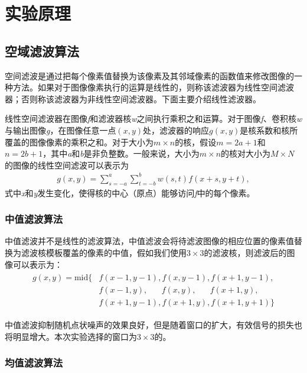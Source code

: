 \documentclass{hitreport}
\begin{document}
\section{实验原理}

\subsection{空域滤波算法}

空间滤波是通过把每个像素值替换为该像素及其邻域像素的函数值来修改图像的一种方法。如果对于图像像素执行的运算是线性的，则称该滤波器为线性空间滤波器；否则称该滤波器为非线性空间滤波器。下面主要介绍线性滤波器。

线性空间滤波器在图像\textit{f}和滤波器核\textit{w}之间执行乘积之和运算。对于图像\textit{f}、卷积核\textit{w}与输出图像\textit{g}，在图像任意一点$\left(x,y\right)$处，滤波器的响应$g\left(x,y\right)$是核系数和核所覆盖的图像像素的乘积之和。对于大小为$m\times n$的核，假设$m=2a+1$和$n=2b+1$，其中\textit{a}和\textit{b}是非负整数。一般来说，大小为$m\times n$的核对大小为$M\times N$的图像的线性空间滤波可以表示为
\begin{align}
g\left(x,y\right) = \sum_{s=-a}^{a}\sum_{t=-b}^{b}w\left(s,t\right)f\left(x+s,y+t\right),
\end{align}
式中\textit{x}和\textit{y}发生变化，使得核的中心（原点）能够访问\textit{f}中的每个像素。

\subsubsection{中值滤波算法}

中值滤波并不是线性的滤波算法，中值滤波会将待滤波图像的相应位置的像素值替换为滤波核模板覆盖的像素的中值，假如我们使用$3\times3$的滤波核，则滤波后的图像可以表示为：
\begin{align}
\begin{split}
g\left(x,y\right) = \text{mid}\{&f\left(x-1,y-1\right),f\left(x,y-1\right),f\left(x+1,y-1\right),\\
&f\left(x-1,y\right),\;\;\;\;\;\;f\left(x,y\right),\;\;\;\;\;\;f\left(x+1,y\right),\\
&f\left(x+1,y-1\right),f\left(x+1,y\right),f\left(x+1,y+1\right)\}
\end{split}
\end{align}

中值滤波抑制随机点状噪声的效果良好，但是随着窗口的扩大，有效信号的损失也将明显增大。本次实验选择的窗口为$3\times3$的。

\subsubsection{均值滤波算法}
\end{document}

